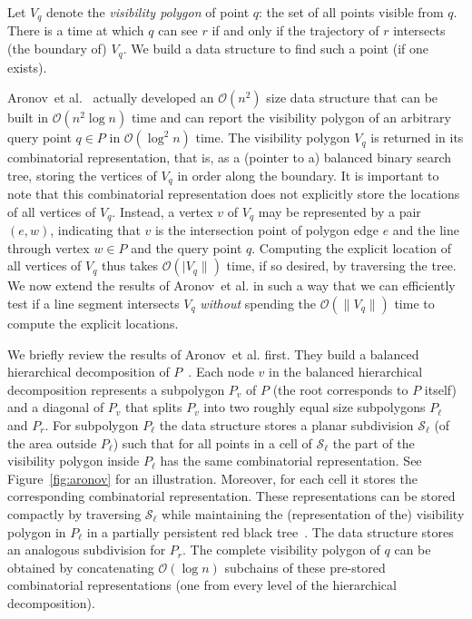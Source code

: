 \documentclass[UKenglish]{lipics-v2019}
\newcommand{\etal}{\textnormal{et al.}\xspace}
\newcommand{\mkmcal}[1]{\ensuremath{\mathcal{#1}}\xspace}
\renewcommand{\O}{\mkmcal{O}}
\renewcommand{\S}{\mkmcal{S}}
\begin{document}
Let $V_q$ denote the \emph{visibility polygon} of point $q$: the set
of all points visible from $q$. There is a time at which $q$ can see
$r$ if and only if the trajectory of $r$ intersects (the boundary of)
$V_q$. We build a data structure to find such a point (if one
exists).

Aronov~\etal~\cite{aronov2002visibility} actually developed an $\O(n^2)$ size
data structure that can be built in $\O(n^2\log n)$ time and can report the
visibility polygon of an arbitrary query point $q \in P$ in $\O(\log^2 n)$
time. The visibility polygon $V_q$ is returned in its combinatorial
representation, that is, as a (pointer to a) balanced binary search tree,
storing the vertices of $V_q$ in order along the boundary. It is important to
note that this combinatorial representation does not explicitly store the
locations of all vertices of $V_q$. Instead, a vertex $v$ of $V_q$ may be
represented by a pair $(e,w)$, indicating that $v$ is the intersection point of
polygon edge $e$ and the line through vertex $w \in P$ and the query point
$q$. Computing the explicit location of all vertices of $V_q$ thus takes
$\O(|V_q\|)$ time, if so desired, by traversing the tree. We now extend the
results of Aronov~\etal in such a way that we can efficiently test if a line
segment intersects $V_q$ \emph{without} spending the $\O(\|V_q\|)$ time to
compute the explicit locations.

We briefly review the results of Aronov~\etal first. They build a
balanced hierarchical decomposition of
$P$~\cite{balanced_hierarchical_subdiv}. Each node $v$ in the balanced
hierarchical decomposition represents a subpolygon $P_v$ of $P$ (the
root corresponds to $P$ itself) and a diagonal of $P_v$ that splits
$P_v$ into two roughly equal size subpolygons $P_\ell$ and $P_r$. For
subpolygon $P_\ell$ the data structure stores a planar subdivision
$\S_\ell$ (of the area outside $P_\ell$) such that for all points in a
cell of $\S_\ell$ the part of the visibility polygon inside $P_\ell$
has the same combinatorial representation. See Figure~\ref{fig:aronov}
for an illustration. Moreover, for each cell it stores the
corresponding combinatorial representation. These representations can
be stored compactly by traversing $\S_\ell$ while maintaining the
(representation of the) visibility polygon in $P_\ell$ in a partially
persistent red black tree~\cite{...}. The data structure stores an
analogous subdivision for $P_r$. The complete visibility polygon of
$q$ can be obtained by concatenating $\O(\log n)$ subchains of these
pre-stored combinatorial representations (one from every level of the
hierarchical decomposition).
\end{document}

